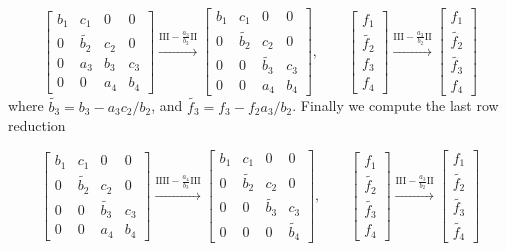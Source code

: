 \documentclass[a4paper,10pt]{article}
\begin{document}
\[
\begin{bmatrix}
b_1 & c_1 & 0 & 0 \\
0& \tilde{b_2}  & c_2 & 0 \\
0 & a_3 & b_3 & c_3 \\
0 & 0 & a_4 & b_4 
\end{bmatrix}
\xrightarrow{\text{III} - \frac{a_3}{b_2}\text{II}}
\begin{bmatrix}
b_1 & c_1 & 0 & 0 \\
0& \tilde{b_2}  & c_2 & 0 \\
0 & 0 & \tilde{b_3} & c_3 \\
0 & 0 & a_4 & b_4 
\end{bmatrix}, \qquad
\begin{bmatrix}
f_1\\
\tilde{f_2}\\
f_3\\
f_4
\end{bmatrix}
\xrightarrow{\text{III} - \frac{a_3}{b_2}\text{II}}
\begin{bmatrix}
f_1\\
\tilde{f_2}\\
\tilde{f_3}\\
f_4
\end{bmatrix}
\]
where $\tilde{b_3} = b_3 - a_3c_2/b_2$, and $\tilde{f_3} = f_3 - f_2a_3/b_2$. Finally we compute the last row reduction

\[
\begin{bmatrix}
b_1 & c_1 & 0 & 0 \\
0& \tilde{b_2}  & c_2 & 0 \\
0 & 0 & \tilde{b_3} & c_3 \\
0 & 0 & a_4 & b_4 
\end{bmatrix}
\xrightarrow{\text{IIII} - \frac{a_4}{b_3}\text{III}}
\begin{bmatrix}
b_1 & c_1 & 0 & 0 \\
0& \tilde{b_2}  & c_2 & 0 \\
0 & 0 & \tilde{b_3} & c_3 \\
0 & 0 & 0 & \tilde{b_4} 
\end{bmatrix}, \qquad
\begin{bmatrix}
f_1\\
\tilde{f_2}\\
\tilde{f_3}\\
f_4
\end{bmatrix}
\xrightarrow{\text{III} - \frac{a_3}{b_2}\text{II}}
\begin{bmatrix}
f_1\\
\tilde{f_2}\\
\tilde{f_3}\\
\tilde{f_4}
\end{bmatrix}
\]
\end{document}
